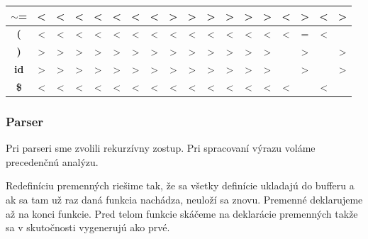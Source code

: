 \documentclass[a4paper, 12pt]{article}
\begin{document}
\begin{table}[!ht]
\begin{tabular}{|c|c|c|c|c|c|c|c|c|c|c|c|c|c|c|c|c|c|}
\textbf{$\sim$=}         & \textless{}    & \textless{}    & \textless{}    & \textless{}    & \textless{}    & \textless{}    & \textless{}    & \textgreater{}       & \textgreater{}        & \textgreater{}          & \textgreater{}           & \textgreater{} & \textgreater{}   & \textless{} & \textgreater{} & \textless{} & \textgreater{} \\ \hline
\textbf{(}               & \textless{}    & \textless{}    & \textless{}    & \textless{}    & \textless{}    & \textless{}    & \textless{}    & \textless{}          & \textless{}           & \textless{}             & \textless{}              & \textless{}    & \textless{}      & \textless{} & =              & \textless{} &                \\ \hline
\textbf{)}               & \textgreater{} & \textgreater{} & \textgreater{} & \textgreater{} & \textgreater{} & \textgreater{} & \textgreater{} & \textgreater{}       & \textgreater{}        & \textgreater{}          & \textgreater{}           & \textgreater{} & \textgreater{}   &             & \textgreater{} &             & \textgreater{} \\ \hline
\textbf{id}              & \textgreater{} & \textgreater{} & \textgreater{} & \textgreater{} & \textgreater{} & \textgreater{} & \textgreater{} & \textgreater{}       & \textgreater{}        & \textgreater{}          & \textgreater{}           & \textgreater{} & \textgreater{}   &             & \textgreater{} &             & \textgreater{} \\ \hline
\textbf{\$}              & \textless{}    & \textless{}    & \textless{}    & \textless{}    & \textless{}    & \textless{}    & \textless{}    & \textless{}          & \textless{}           & \textless{}             & \textless{}              & \textless{}    & \textless{}      & \textless{} &                & \textless{} &                \\ \hline
\end{tabular}
\end{table}
\FloatBarrier

\subsubsection{Parser}

Pri parseri sme zvolili rekurzívny zostup. Pri spracovaní výrazu voláme precedenčnú analýzu.

Redefiníciu premenných riešime tak, že sa všetky definície ukladajú do bufferu a ak sa tam už raz daná funkcia nachádza, neuloží sa znovu. Premenné deklarujeme až na konci funkcie. Pred telom funkcie skáčeme na deklarácie premenných takže sa v skutočnosti vygenerujú ako prvé.
\end{document}
